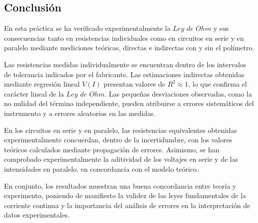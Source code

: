 \documentclass[11pt]{report}
\begin{document}
\begin{refsection}
\section{\textbf{Conclusión}}

En esta práctica se ha verificado experimentalmente la $Ley$ $de$ $Ohm$ y sus consecuencias 
tanto en resistencias individuales como en circuitos en serie y
en paralelo mediante mediciones teóricas, directas e indirectas con y sin el polímetro.

Las resistencias medidas individualmente se encuentran dentro de los intervalos de tolerancia indicados
por el fabricante. Las estimaciones indirectas obtenidas mediante regresión lineal $V(I)$ presentan valores
de $R^2 \approx 1$, lo que confirma el carácter lineal de la $Ley$ $de$ $Ohm$. Las
pequeñas desviaciones observadas, como la no nulidad del término independiente, pueden atribuirse a errores
sistemáticos del instrumento y a errores aleatorios en las medidas.

En los circuitos en serie y en paralelo, las resistencias equivalentes obtenidas experimentalmente concuerdan,
dentro de la incertidumbre, con los valores teóricos calculados mediante propagación de errores. Asimismo,
se han comprobado experimentalmente la aditividad de los voltajes en serie y de las intensidades en paralelo,
en concordancia con el modelo teórico.

En conjunto, los resultados muestran una buena concordancia entre teoría y experimento, poniendo de
manifiesto la validez de las leyes fundamentales de la corriente continua y la importancia del análisis de
errores en la interpretación de datos experimentales.

\nocite{*}
\printbibliography[keyword={parteA},title={\textbf{Bibliografía}},heading=subbibnumbered]
\end{refsection}
\end{document}
